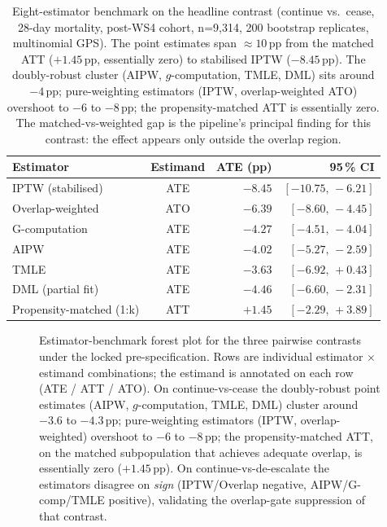 \documentclass[11pt,a4paper]{article}
\begin{document}
\begin{table}[H]
  \centering
  \small
  \caption{Eight-estimator benchmark on the headline contrast (continue vs.\ cease, 28-day mortality, post-WS4 cohort, n=9{,}314, 200 bootstrap replicates, multinomial GPS). The point estimates span $\approx 10$\,pp from the matched ATT ($+1.45$\,pp, essentially zero) to stabilised IPTW ($-8.45$\,pp). The doubly-robust cluster (AIPW, $g$-computation, TMLE, DML) sits around $-4$\,pp; pure-weighting estimators (IPTW, overlap-weighted ATO) overshoot to $-6$ to $-8$\,pp; the propensity-matched ATT is essentially zero. The matched-vs-weighted gap is the pipeline's principal finding for this contrast: the effect appears only outside the overlap region.}
  \label{tab:benchmark}
  \begin{tabular}{lcrr}
    \toprule
    Estimator & Estimand & ATE (pp) & 95\,\% CI \\
    \midrule
    IPTW (stabilised)             & ATE & $-8.45$ & $[-10.75,\,-6.21]$ \\
    Overlap-weighted              & ATO & $-6.39$ & $[-8.60,\,-4.45]$ \\
    G-computation                 & ATE & $-4.27$ & $[-4.51,\,-4.04]$ \\
    AIPW                          & ATE & $-4.02$ & $[-5.27,\,-2.59]$ \\
    TMLE                          & ATE & $-3.63$ & $[-6.92,\,+0.43]$ \\
    DML (partial fit)             & ATE & $-4.46$ & $[-6.60,\,-2.31]$ \\
    Propensity-matched (1:k)      & ATT & $+1.45$ & $[-2.29,\,+3.89]$ \\
    \bottomrule
  \end{tabular}
\end{table}

\begin{figure}[H]
  \centering
  \caption{Estimator-benchmark forest plot for the three pairwise contrasts under the locked pre-specification. Rows are individual estimator $\times$ estimand combinations; the estimand is annotated on each row (ATE / ATT / ATO). On continue-vs-cease the doubly-robust point estimates (AIPW, $g$-computation, TMLE, DML) cluster around $-3.6$ to $-4.3$\,pp; pure-weighting estimators (IPTW, overlap-weighted) overshoot to $-6$ to $-8$\,pp; the propensity-matched ATT, on the matched subpopulation that achieves adequate overlap, is essentially zero ($+1.45$\,pp). On continue-vs-de-escalate the estimators disagree on \emph{sign} (IPTW/Overlap negative, AIPW/G-comp/TMLE positive), validating the overlap-gate suppression of that contrast.}
  \label{fig:benchmark}
\end{figure}
\FloatBarrier
\end{document}
